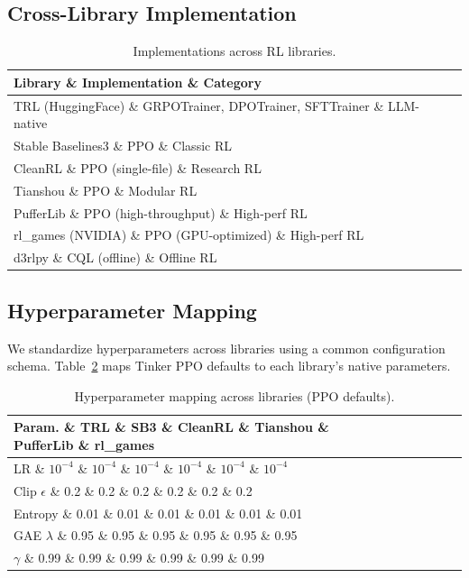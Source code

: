 \documentclass[manuscript,review,anonymous]{acmart}
\begin{document}
\subsection{Cross-Library Implementation}

\begin{table}[h]
\centering
\caption{Implementations across RL libraries.}
\label{tab:implementations}
\begin{tabular}{lll}
\toprule
\textbf{Library} \& \textbf{Implementation} \& \textbf{Category} \\
\midrule
TRL (HuggingFace) \& GRPOTrainer, DPOTrainer, SFTTrainer \& LLM-native \\
Stable Baselines3 \& PPO \& Classic RL \\
CleanRL \& PPO (single-file) \& Research RL \\
Tianshou \& PPO \& Modular RL \\
PufferLib \& PPO (high-throughput) \& High-perf RL \\
rl\_games (NVIDIA) \& PPO (GPU-optimized) \& High-perf RL \\
d3rlpy \& CQL (offline) \& Offline RL \\
\bottomrule
\end{tabular}
\end{table}

\subsection{Hyperparameter Mapping}

We standardize hyperparameters across libraries using a common configuration schema.
Table~\ref{tab:hyperparams} maps Tinker PPO defaults to each library's native parameters.

\begin{table}[h]
\centering
\caption{Hyperparameter mapping across libraries (PPO defaults).}
\label{tab:hyperparams}
\begin{tabular}{lcccccc}
\toprule
\textbf{Param.} \& \textbf{TRL} \& \textbf{SB3} \& \textbf{CleanRL} \& \textbf{Tianshou} \& \textbf{PufferLib} \& \textbf{rl\_games} \\
\midrule
LR \& $10^{-4}$ \& $10^{-4}$ \& $10^{-4}$ \& $10^{-4}$ \& $10^{-4}$ \& $10^{-4}$ \\
Clip $\epsilon$ \& 0.2 \& 0.2 \& 0.2 \& 0.2 \& 0.2 \& 0.2 \\
Entropy \& 0.01 \& 0.01 \& 0.01 \& 0.01 \& 0.01 \& 0.01 \\
GAE $\lambda$ \& 0.95 \& 0.95 \& 0.95 \& 0.95 \& 0.95 \& 0.95 \\
$\gamma$ \& 0.99 \& 0.99 \& 0.99 \& 0.99 \& 0.99 \& 0.99 \\
\bottomrule
\end{tabular}
\end{table}
\end{document}
